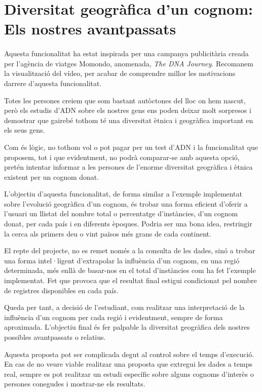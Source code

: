 \section{Diversitat geogràfica d'un cognom: Els nostres a\-vant\-pa\-ssats}

    \paragraph{}
    Aquesta funcionalitat ha estat inspirada per una campanya publicitària creada per l'agència de viatges Momondo, anomenada, \emph{The DNA Journey}. Recomanem la visualització del vídeo, per acabar de comprendre millor les motivacions darrere d'aquesta funcionalitat.

    Totes les persones creiem que som bastant autòctones del lloc on hem nascut, però els estudis d'ADN sobre els nostres gens ens poden deixar molt sorpresos i demostrar que gairebé tothom té una diversitat ètnica i geogràfica important en els seus gens.

    Com és lògic, no tothom vol o pot pagar per un test d'ADN i la funcionalitat que proposem, tot i que evidentment, no podrà comparar-se amb aquesta opció, pretén intentar informar a les persones de l’enorme diversitat geogràfica i ètnica existent per un cognom donat.

    L'objectiu d'aquesta funcionalitat, de forma similar a l'exemple implementat sobre l'evolució geogràfica d'un cognom, és trobar una forma eficient d'oferir a l'usuari un llistat del nombre total o percentatge d'instàncies, d'un cognom donat, per cada país i en diferents èpoques. Podria ser una bona idea, restringir la cerca als primers deu o vint països més grans de cada continent.

    El repte del projecte, no es remet només a la consulta de les dades, sinó a trobar una forma intel·ligent d'extrapolar la influència d'un cognom, en una regió determinada, més enllà de basar-nos en el total d'instàncies com ha fet l'exemple implementat. Fet que provoca que el resultat final estigui condicionat pel nombre de registres disponibles en cada país.

    Queda per tant, a decisió de l'estudiant, com realitzar una interpretació de la influència d'un cognom per cada regió i evidentment, sempre de forma aproximada. L'objectiu final és fer palpable la diversitat geogràfica dels nostres possibles avantpassats o relatius.

    Aquesta proposta pot ser complicada degut al control sobre el temps d'execució. En cas de no veure viable realitzar una proposta que extregui les dades a temps real, sempre es pot realitzar un estudi específic sobre alguns cognoms d'interès o persones conegudes i mostrar-ne els resultats.
